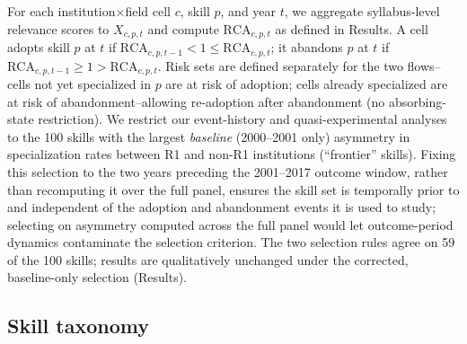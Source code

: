 \documentclass[11pt, letterpaper]{article}
\begin{document}
For each institution$\times$field cell $c$, skill $p$, and year $t$, we aggregate syllabus-level relevance scores to $X_{c,p,t}$ and compute $\mathrm{RCA}_{c,p,t}$ as defined in Results. A cell adopts skill $p$ at $t$ if $\mathrm{RCA}_{c,p,t-1} < 1 \leq \mathrm{RCA}_{c,p,t}$; it abandons $p$ at $t$ if $\mathrm{RCA}_{c,p,t-1} \geq 1 > \mathrm{RCA}_{c,p,t}$. Risk sets are defined separately for the two flows--cells not yet specialized in $p$ are at risk of adoption; cells already specialized are at risk of abandonment--allowing re-adoption after abandonment (no absorbing-state restriction). We restrict our event-history and quasi-experimental analyses to the 100 skills with the largest \emph{baseline} (2000--2001 only) asymmetry in specialization rates between R1 and non-R1 institutions (``frontier'' skills). Fixing this selection to the two years preceding the 2001--2017 outcome window, rather than recomputing it over the full panel, ensures the skill set is temporally prior to and independent of the adoption and abandonment events it is used to study; selecting on asymmetry computed across the full panel would let outcome-period dynamics contaminate the selection criterion. The two selection rules agree on 59 of the 100 skills; results are qualitatively unchanged under the corrected, baseline-only selection (Results).

\subsection*{Skill taxonomy}
\end{document}
